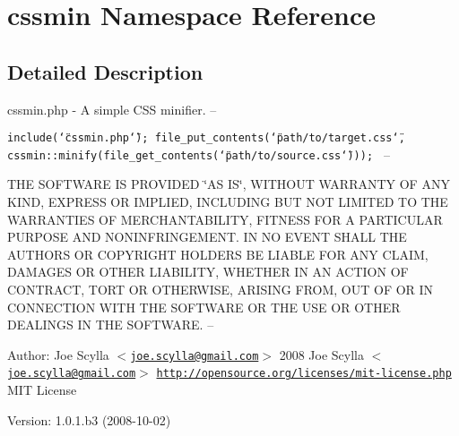\hypertarget{namespacecssmin}{
\section{cssmin Namespace Reference}
\label{namespacecssmin}
}




\subsection{Detailed Description}
cssmin.php - A simple CSS minifier. --

{\tt  include(\char`\"{}cssmin.php\char`\"{}); file\_\-put\_\-contents(\char`\"{}path/to/target.css\char`\"{}, cssmin::minify(file\_\-get\_\-contents(\char`\"{}path/to/source.css\char`\"{}))); } --

THE SOFTWARE IS PROVIDED \char`\"{}AS IS\char`\"{}, WITHOUT WARRANTY OF ANY KIND, EXPRESS OR IMPLIED, INCLUDING BUT NOT LIMITED TO THE WARRANTIES OF MERCHANTABILITY, FITNESS FOR A PARTICULAR PURPOSE AND NONINFRINGEMENT. IN NO EVENT SHALL THE AUTHORS OR COPYRIGHT HOLDERS BE LIABLE FOR ANY CLAIM, DAMAGES OR OTHER LIABILITY, WHETHER IN AN ACTION OF CONTRACT, TORT OR OTHERWISE, ARISING FROM, OUT OF OR IN CONNECTION WITH THE SOFTWARE OR THE USE OR OTHER DEALINGS IN THE SOFTWARE. --

\begin{Desc}
\item[Author:]Joe Scylla $<$\href{mailto:joe.scylla@gmail.com}{\tt joe.scylla@gmail.com}$>$  2008 Joe Scylla $<$\href{mailto:joe.scylla@gmail.com}{\tt joe.scylla@gmail.com}$>$  \href{http://opensource.org/licenses/mit-license.php}{\tt http://opensource.org/licenses/mit-license.php} MIT License \end{Desc}
\begin{Desc}
\item[Version:]1.0.1.b3 (2008-10-02) \end{Desc}
